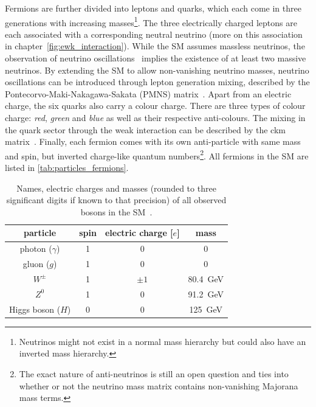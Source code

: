 
Fermions are further divided into leptons and quarks, which each come in three generations with increasing masses\footnote{Neutrinos might not exist in a normal mass hierarchy but could also have an inverted mass hierarchy.}. The three electrically charged leptons are each associated with a corresponding neutral neutrino (more on this association in chapter~\cref{fig:ewk_interaction}). While the SM assumes massless neutrinos, the observation of neutrino oscillations~\cite{Fukuda:1998mi} implies the existence of at least two massive neutrinos. By extending the SM to allow non-vanishing neutrino masses, neutrino oscillations can be introduced through lepton generation mixing, described by the Pontecorvo-Maki-Nakagawa-Sakata (PMNS) matrix~\cite{PMNS:1962mu}. Apart from an electric charge, the six quarks also carry a colour charge. There are three types of colour charge: \textit{red}, \textit{green} and \textit{blue} as well as their respective anti-colours. The mixing in the quark sector through the weak interaction can be described by the \gls{ckm} matrix~\cite{PhysRevLett.10.531,CKM:1973fv}. Finally, each fermion comes with its own anti-particle with same mass and spin, but inverted charge-like quantum numbers\footnote{The exact nature of anti-neutrinos is still an open question and ties into whether or not the neutrino mass matrix contains non-vanishing Majorana mass terms.}. All fermions in the SM are listed in \cref{tab:particles_fermions}.


\begin{table}
	\centering
	\setlength\heavyrulewidth{0.2ex}
	\small
	\caption{Names, electric charges and masses (rounded to three significant digits if known to that precision) of all observed bosons in the SM~\cite{pdg2020}.}
	\begin{tabular} {c c c c}
	\toprule
		particle & spin & electric charge [$e$]& mass \\ 
	\midrule
		photon ($\gamma$) & 1 & 0 & 0\\
		gluon ($g$) & 1 & 0 & 0 \\
		$W^\pm$ & 1 & $\pm 1$ & \SI{80.4}{\GeV} \\
		$Z^0$ & 1 & 0 & \SI{91.2}{\GeV} \\
		Higgs boson ($H$) & 0 & 0 & \SI{125}{\GeV} \\
	\bottomrule					
	\end{tabular}\vspace{3mm}
	\label{tab:particles_bosons}   
\end{table}

